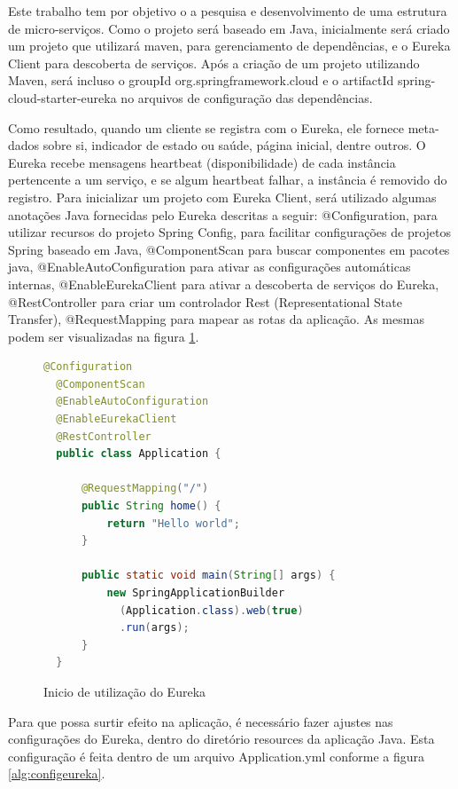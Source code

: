 \documentclass[journal]{IEEEtran}
\begin{document}
Este trabalho tem por objetivo o a pesquisa e desenvolvimento de uma estrutura de micro-serviços. Como o projeto será baseado em Java, inicialmente será criado um projeto que utilizará maven, para gerenciamento de dependências, e o Eureka Client para descoberta de serviços. Após a criação de um projeto utilizando Maven, será incluso o groupId org.springframework.cloud e o artifactId spring-cloud-starter-eureka no arquivos de configuração das dependências.

Como resultado, quando um cliente se registra com o Eureka, ele fornece meta-dados sobre si, indicador de estado ou saúde, página inicial, dentre outros. O Eureka recebe mensagens heartbeat (disponibilidade) de cada instância pertencente a um serviço, e se algum heartbeat falhar, a instância é removido do registro.
Para inicializar um projeto com Eureka Client, será utilizado algumas anotações Java fornecidas pelo Eureka descritas a seguir: @Configuration, para utilizar recursos do projeto Spring Config, para facilitar configurações de projetos Spring baseado em Java, @ComponentScan para buscar componentes em pacotes java, @EnableAutoConfiguration para ativar as configurações automáticas internas, @EnableEurekaClient para ativar a descoberta de serviços do Eureka, @RestController para criar um controlador Rest (Representational State Transfer), @RequestMapping para mapear as rotas da aplicação. As mesmas podem ser visualizadas na figura \ref{alg:eurekainicio}.

\begin{figure}[h]
\centering

\begin{lstlisting}[language=Java]
  @Configuration
  @ComponentScan
  @EnableAutoConfiguration
  @EnableEurekaClient
  @RestController
  public class Application {

      @RequestMapping("/")
      public String home() {
          return "Hello world";
      }

      public static void main(String[] args) {
          new SpringApplicationBuilder
            (Application.class).web(true)
            .run(args);
      }
  }
\end{lstlisting}

\caption{Inicio de utilização do Eureka}
\label{alg:eurekainicio}
\end{figure}

Para que possa surtir efeito na aplicação, é necessário fazer ajustes nas configurações do Eureka, dentro do diretório resources da aplicação Java. Esta configuração é feita dentro de um arquivo Application.yml conforme a figura \ref{alg:configeureka}.
\end{document}
